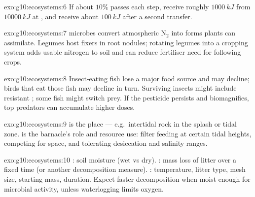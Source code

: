 \begin{solution}{exo:g10:ecosystems:6}
If about $10\%$ passes each step,  receive roughly
$\qty{1000}{kJ}$ from $\qty{10000}{kJ}$ at , and 
receive about $\qty{100}{kJ}$ after a second transfer.
\end{solution}

\begin{solution}{exo:g10:ecosystems:7}
 microbes convert atmospheric $\mathrm{N_2}$ into forms plants
can assimilate. Legumes host fixers in root nodules; rotating legumes into a
cropping system adds usable nitrogen to soil and can reduce fertiliser need
for following crops.
\end{solution}

\begin{solution}{exo:g10:ecosystems:8}
Insect-eating fish lose a major food source and may decline; birds that eat
those fish may decline in turn. Surviving insects might include resistant
; some fish might switch prey. If the pesticide persists and
biomagnifies, top predators can accumulate higher doses.
\end{solution}

\begin{solution}{exo:g10:ecosystems:9}
 is the place --- e.g.\ intertidal rock in the splash or tidal zone.
 is the barnacle's role and resource use: filter feeding at certain tidal
heights, competing for space, and tolerating desiccation and salinity ranges.
\end{solution}

\begin{solution}{exo:g10:ecosystems:10}
: soil moisture (wet vs dry). : mass
loss of litter over a fixed time (or another decomposition measure). : temperature, litter type, mesh size, starting mass, duration.
Expect faster decomposition when moist enough for microbial activity, unless
waterlogging limits oxygen.
\end{solution}

